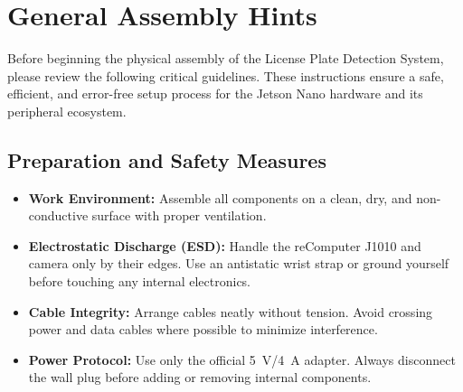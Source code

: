 %
%

\chapter{General Assembly Hints}

Before beginning the physical assembly of the License Plate Detection System, please review the following critical guidelines. These instructions ensure a safe, efficient, and error-free setup process for the Jetson Nano hardware and its peripheral ecosystem.

\section{Preparation and Safety Measures}

\begin{itemize}
	\item \textbf{Work Environment:} Assemble all components on a clean, dry, and non-conductive surface with proper ventilation.
	\item \textbf{Electrostatic Discharge (ESD):} Handle the reComputer J1010 and camera only by their edges. Use an antistatic wrist strap or ground yourself before touching any internal electronics.
	\item \textbf{Cable Integrity:} Arrange cables neatly without tension. Avoid crossing power and data cables where possible to minimize interference.
	\item \textbf{Power Protocol:} Use only the official \SI{5}{\volt}/\SI{4}{\ampere} adapter. Always disconnect the wall plug before adding or removing internal components.
\end{itemize}

